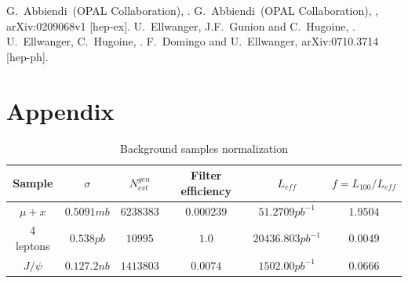 \documentclass[aps,prd,onecolumn,superscriptaddress,showpacs]{revtex4}
\begin{document}
\begin{thebibliography}{99}
 G.~Abbiendi~\etal (OPAL Collaboration), .
 G.~Abbiendi~\etal (OPAL Collaboration), , arXiv:0209068v1 [hep-ex].
 U.~Ellwanger, J.F.~Gunion and C.~Hugoine, .
 U.~Ellwanger, C.~Hugoine, .
 F.~Domingo and U.~Ellwanger, arXiv:0710.3714 [hep-ph].




%
%

    
\end{thebibliography}

\section{Appendix}


\begin{table}[t]
\caption{Background samples normalization\label{bckgr_normalize}}
\begin{center}
\begin{tabular}{|c|c|c|c|c|c|}
\hline
Sample & $\sigma$ & $N^{gen}_{evt}$ & Filter efficiency & $L_{eff}$ & $f = L_{100}/L_{eff}$ \\ \hline
$\mu+x$ &           $0.5091mb$    &    $6238383$      &    $0.000239$  &  $51.2709pb^{-1}$   &  $1.9504$ \\ \hline
4 leptons &        $0.538pb$     &    $10995$        &    $1.0$       &  $20436.803pb^{-1}$ &  $0.0049$ \\ \hline
$J/\psi$ &         $0.127.2nb$   &    $1413803$      &    $0.0074$    &  $1502.00pb^{-1}$   &  $0.0666$ \\ \hline

\end{tabular}
\end{center}
\end{table}
\end{document}
